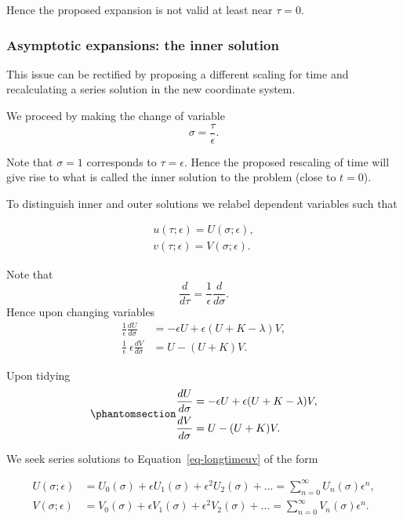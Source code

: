\documentclass[
  letterpaper,
  DIV=11,
  numbers=noendperiod]{scrreprt}
\begin{document}
Hence the proposed expansion is not valid at least near \(\tau=0\).

\subsubsection{Asymptotic expansions: the inner
solution}\label{asymptotic-expansions-the-inner-solution}

This issue can be rectified by proposing a different scaling for time
and recalculating a series solution in the new coordinate system.

We proceed by making the change of variable \[
\sigma=\frac{\tau}{\epsilon}.
\]

Note that \(\sigma=1\) corresponds to \(\tau=\epsilon\). Hence the
proposed rescaling of time will give rise to what is called the inner
solution to the problem (close to \(t=0\)).

To distinguish inner and outer solutions we relabel dependent variables
such that

\[
\begin{aligned}
u(\tau;\epsilon)=U(\sigma;\epsilon),  \nonumber \\ 
v(\tau;\epsilon)=V(\sigma;\epsilon). \nonumber 
\end{aligned}
\]

Note that \[
\frac{d}{d\tau}=\frac{1}{\epsilon}\frac{d}{d\sigma}.
\] Hence upon changing variables \[
\begin{aligned}
\frac{1}{\epsilon}\frac{d U}{d\sigma} &= -\epsilon U+ \epsilon (U+K-\lambda)V, \nonumber \\
\frac{1}{\epsilon}\ \epsilon \frac{d V}{d\sigma} &= U-(U+K)V.  
\end{aligned}
\]

Upon tidying
\begin{equation}\protect\phantomsection\label{eq-longtimeuv}{
\begin{aligned}
\frac{d U}{d\sigma} &= -\epsilon U+ \epsilon (U+K-\lambda)V, \nonumber \\
\frac{d V}{d\sigma} &= U-(U+K)V.  
\end{aligned}
}\end{equation}

We seek series solutions to Equation~\ref{eq-longtimeuv} of the form

\[
\begin{aligned}
U(\sigma;\epsilon)&=U_0(\sigma) + \epsilon U_1(\sigma) + \epsilon^2 U_2(\sigma) + ... = \sum_{n=0}^{\infty}U_n(\sigma)\epsilon^n, \nonumber \\
V(\sigma;\epsilon)&=V_0(\sigma) + \epsilon V_1(\sigma) + \epsilon^2 V_2(\sigma) + ... = \sum_{n=0}^{\infty}V_n(\sigma)\epsilon^n. \nonumber  
\end{aligned}
\]
\end{document}
